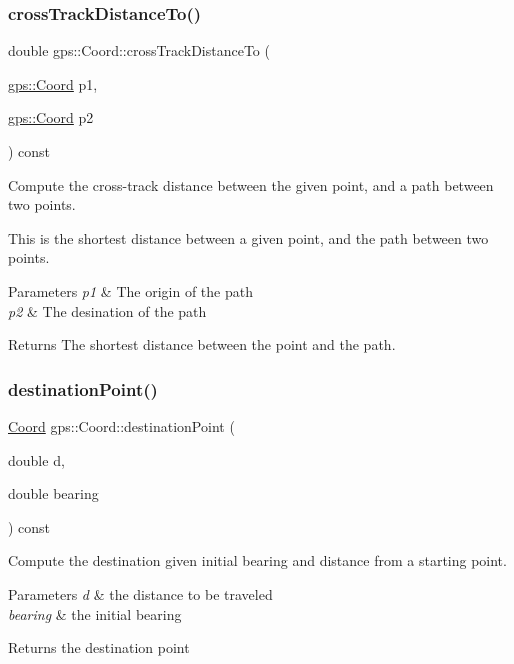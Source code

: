 \subsubsection{\texorpdfstring{cross\+Track\+Distance\+To()}{crossTrackDistanceTo()}}
{\footnotesize\ttfamily double gps\+::\+Coord\+::cross\+Track\+Distance\+To (\begin{DoxyParamCaption}\item[{\hyperlink{classgps_1_1Coord}{gps\+::\+Coord}}]{p1,  }\item[{\hyperlink{classgps_1_1Coord}{gps\+::\+Coord}}]{p2 }\end{DoxyParamCaption}) const}

Compute the cross-\/track distance between the given point, and a path between two points.

This is the shortest distance between a given point, and the path between two points.


\begin{DoxyParams}{Parameters}
{\em p1} & The origin of the path \\
\hline
{\em p2} & The desination of the path \\
\hline
\end{DoxyParams}
\begin{DoxyReturn}{Returns}
The shortest distance between the point and the path. 
\end{DoxyReturn}
\mbox{\label{classgps_1_1Coord_a774fc85267d9cd3d01d151e784f1112c}} 
\subsubsection{\texorpdfstring{destination\+Point()}{destinationPoint()}}
{\footnotesize\ttfamily \hyperlink{classgps_1_1Coord}{Coord} gps\+::\+Coord\+::destination\+Point (\begin{DoxyParamCaption}\item[{double}]{d,  }\item[{double}]{bearing }\end{DoxyParamCaption}) const}

Compute the destination given initial bearing and distance from a starting point. 
\begin{DoxyParams}{Parameters}
{\em d} & the distance to be traveled \\
\hline
{\em bearing} & the initial bearing \\
\hline
\end{DoxyParams}
\begin{DoxyReturn}{Returns}
the destination point 
\end{DoxyReturn}
\mbox{\label{classgps_1_1Coord_a24d3b9899dc262a40728f7e343781ab6}} 
